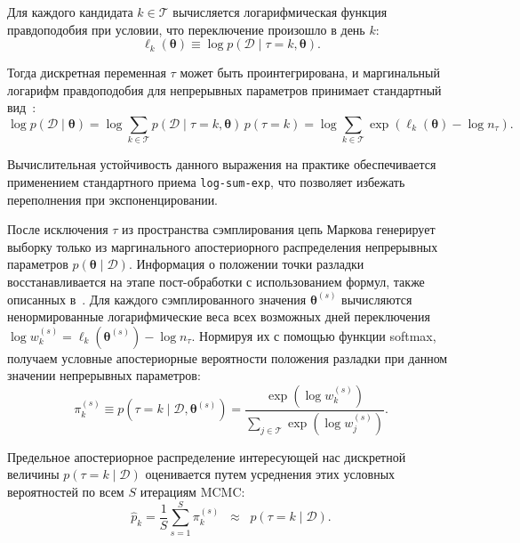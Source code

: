 \documentclass[14pt]{mmcs_article}
\begin{document}
Для каждого кандидата $k \in \mathcal{T}$ вычисляется
логарифмическая функция правдоподобия при условии, что
переключение произошло в день $k$:
\begin{equation}\label{eq:loglik_k}
	\ell_k(\boldsymbol{\theta}) \equiv
	\log p(\mathcal{D} \mid \tau = k, \boldsymbol{\theta}).
\end{equation}

Тогда дискретная переменная $\tau$ может быть проинтегрирована,
и маргинальный логарифм правдоподобия для непрерывных
параметров принимает стандартный вид~\cite{%
	lai2023automaticallymarginalizedmcmcprobabilistic}:
\begin{equation}\label{eq:marginal_loglik}
	\log p(\mathcal{D} \mid \boldsymbol{\theta}) 
	= \log \sum_{k \in \mathcal{T}}
	p(\mathcal{D} \mid \tau = k, \boldsymbol{\theta})\,
	p(\tau = k)
	= \log \sum_{k \in \mathcal{T}}
	\exp \left( \ell_k(\boldsymbol{\theta})
	- \log n_{\tau} \right).
\end{equation}

Вычислительная устойчивость данного выражения на практике
обеспечивается применением стандартного приема
\texttt{log-sum-exp}, что позволяет избежать переполнения при
экспоненцировании.

После исключения $\tau$ из пространства сэмплирования цепь
Маркова генерирует выборку только из маргинального
апостериорного распределения непрерывных параметров
$p(\boldsymbol{\theta} \mid \mathcal{D})$. Информация о
положении точки разладки восстанавливается на этапе
пост-обработки с использованием формул, также описанных
в~\cite{lai2023automaticallymarginalizedmcmcprobabilistic}. Для
каждого сэмплированного значения $\boldsymbol{\theta}^{(s)}$
вычисляются ненормированные логарифмические веса всех возможных
дней переключения
$\log w_k^{(s)} = \ell_k(\boldsymbol{\theta}^{(s)})
- \log n_{\tau}$. Нормируя их с помощью функции softmax,
получаем условные апостериорные вероятности положения разладки
при данном значении непрерывных параметров:
\begin{equation}\label{eq:cond_tau_probs}
	\pi_k^{(s)} \equiv
	p(\tau = k \mid \mathcal{D}, \boldsymbol{\theta}^{(s)}) 
	= \frac{\exp\left(\log w_k^{(s)}\right)}
	{\sum_{j \in \mathcal{T}}
		\exp\left(\log w_j^{(s)}\right)}.
\end{equation}

Предельное апостериорное распределение интересующей нас
дискретной величины $p(\tau = k \mid \mathcal{D})$ оценивается
путем усреднения этих условных вероятностей по всем $S$
итерациям MCMC:
\begin{equation}\label{eq:marginal_tau}
	\hat{p}_k = \frac{1}{S} \sum_{s=1}^{S} \pi_k^{(s)}
	\;\; \approx \;\; p(\tau = k \mid \mathcal{D}).
\end{equation}
\end{document}
